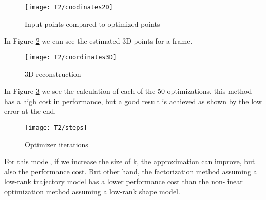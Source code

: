 \begin{figure}[h]
    \centering
    \texttt{[image: T2/coodinates2D]}
    \caption{Input points compared to optimized points}
    \label{fig:coodinates2D}
\end{figure}

\noindent In Figure \ref{fig:coordinates3D} we can see the estimated 3D points for a frame.\\
\begin{figure}[h]
    \centering
    \texttt{[image: T2/coordinates3D]}
    \caption{3D reconstruction}
    \label{fig:coordinates3D}
\end{figure}
\noindent In Figure \ref{fig:steps} we see the calculation of each of the 50 optimizations, this method has a high cost in performance, but a good result is achieved as shown by the low error at the end.\\
\begin{figure}[h]
    \centering
    \texttt{[image: T2/steps]}
    \caption{Optimizer iterations}
    \label{fig:steps}
\end{figure}

\noindent For this model, if we increase the size of k, the approximation can improve, but also the performance cost. But other hand, the factorization method assuming a low-rank trajectory model has a lower performance cost than the non-linear optimization method assuming a low-rank shape model.
